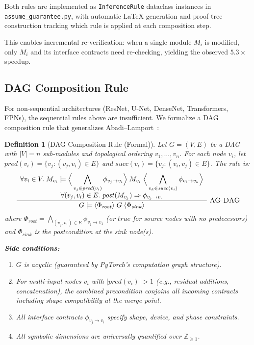 \documentclass[11pt]{article}
\newtheorem{definition}[theorem]{Definition}
\begin{document}
Both rules are implemented as \texttt{InferenceRule} dataclass instances
in \texttt{assume\_guarantee.py}, with automatic \LaTeX{} generation
and proof tree construction tracking which rule is applied at each
composition step.

This enables incremental re-verification: when a single module
$M_i$ is modified, only $M_i$ and its interface contracts need
re-checking, yielding the observed $5.3\times$ speedup.

\subsection{DAG Composition Rule}\label{app:dag-rule}

For non-sequential architectures (ResNet, U-Net, DenseNet,
Transformers, FPNs), the sequential rules above are insufficient.
We formalize a DAG composition rule that generalizes
Abadi--Lamport~\cite{abadi95}:

\begin{definition}[DAG Composition Rule (Formal)]
Let $G = (V, E)$ be a DAG with $|V| = n$ sub-modules and
topological ordering $v_1, \ldots, v_n$.
For each node $v_i$, let $\mathit{pred}(v_i) = \{v_j : (v_j, v_i) \in E\}$
and $\mathit{succ}(v_i) = \{v_j : (v_i, v_j) \in E\}$.
The rule is:
\[
\frac{
  \begin{array}{c}
  \forall v_i \in V.\;
  M_{v_i} \models
  \Big\langle \displaystyle\bigwedge_{v_j \in \mathit{pred}(v_i)} \phi_{v_j \to v_i} \Big\rangle\;
  M_{v_i} \;
  \Big\langle \displaystyle\bigwedge_{v_k \in \mathit{succ}(v_i)} \phi_{v_i \to v_k} \Big\rangle
  \\[6pt]
  \forall (v_j, v_i) \in E.\;
  \mathit{post}(M_{v_j}) \Rightarrow \phi_{v_j \to v_i}
  \end{array}
}{
  G \models \langle \Phi_{\mathit{root}} \rangle\; G \;\langle \Phi_{\mathit{sink}} \rangle
}
\;\textsc{AG-DAG}
\]
where $\Phi_{\mathit{root}} = \bigwedge_{(v_j, v_1) \in E} \phi_{v_j \to v_1}$
(or $\mathit{true}$ for source nodes with no predecessors) and
$\Phi_{\mathit{sink}}$ is the postcondition at the sink node(s).

\textbf{Side conditions:}
\begin{enumerate}[leftmargin=2em,nosep]
  \item $G$ is acyclic (guaranteed by PyTorch's computation graph
    structure).
  \item For multi-input nodes $v_i$ with $|\mathit{pred}(v_i)| > 1$
    (e.g., residual additions, concatenation),
    the combined precondition conjoins all incoming contracts
    including shape compatibility at the merge point.
  \item All interface contracts $\phi_{v_j \to v_i}$ specify shape,
    device, and phase constraints.
  \item All symbolic dimensions are universally quantified
    over $\mathbb{Z}_{\geq 1}$.
\end{enumerate}
\end{definition}
\end{document}
